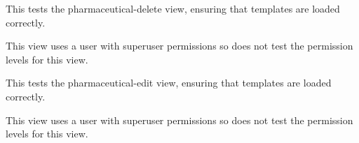 \documentclass[letterpaper,10pt,english]{sphinxmanual}
\begin{document}
\begin{fulllineitems}

\begin{fulllineitems}
\label{data:mousedb.data.tests.PharmaceuticalViewTests.test_pharmaceutical_view_delete}
This tests the pharmaceutical-delete view, ensuring that templates are loaded correctly.

This view uses a user with superuser permissions so does not test the permission levels for this view.

\end{fulllineitems}


\begin{fulllineitems}
\label{data:mousedb.data.tests.PharmaceuticalViewTests.test_pharmaceutical_view_edit}
This tests the pharmaceutical-edit view, ensuring that templates are loaded correctly.

This view uses a user with superuser permissions so does not test the permission levels for this view.

\end{fulllineitems}


\end{fulllineitems}

\end{document}
